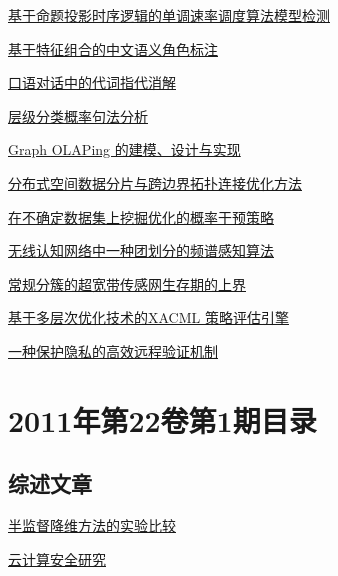 \documentclass[a4paper]{article}
\begin{document}
\href{http://www.jos.org.cn/ch/reader/download_pdf.aspx?file_no=3729&year_id=2011&quarter_id=2&falg=1}{基于命题投影时序逻辑的单调速率调度算法模型检测}

\href{http://www.jos.org.cn/ch/reader/download_pdf.aspx?file_no=3844&year_id=2011&quarter_id=2&falg=1}{基于特征组合的中文语义角色标注}

\href{http://www.jos.org.cn/ch/reader/download_pdf.aspx?file_no=3720&year_id=2011&quarter_id=2&falg=1}{口语对话中的代词指代消解}

\href{http://www.jos.org.cn/ch/reader/download_pdf.aspx?file_no=3809&year_id=2011&quarter_id=2&falg=1}{层级分类概率句法分析}

\href{http://www.jos.org.cn/ch/reader/download_pdf.aspx?file_no=3771&year_id=2011&quarter_id=2&falg=1}{Graph OLAPing 的建模、设计与实现}

\href{http://www.jos.org.cn/ch/reader/download_pdf.aspx?file_no=3798&year_id=2011&quarter_id=2&falg=1}{分布式空间数据分片与跨边界拓扑连接优化方法}

\href{http://www.jos.org.cn/ch/reader/download_pdf.aspx?file_no=3829&year_id=2011&quarter_id=2&falg=1}{在不确定数据集上挖掘优化的概率干预策略}

\href{http://www.jos.org.cn/ch/reader/download_pdf.aspx?file_no=3721&year_id=2011&quarter_id=2&falg=1}{无线认知网络中一种团划分的频谱感知算法}

\href{http://www.jos.org.cn/ch/reader/download_pdf.aspx?file_no=3748&year_id=2011&quarter_id=2&falg=1}{常规分簇的超宽带传感网生存期的上界}

\href{http://www.jos.org.cn/ch/reader/download_pdf.aspx?file_no=3707&year_id=2011&quarter_id=2&falg=1}{基于多层次优化技术的XACML 策略评估引擎}

\href{http://www.jos.org.cn/ch/reader/download_pdf.aspx?file_no=3714&year_id=2011&quarter_id=2&falg=1}{一种保护隐私的高效远程验证机制}


\section{\textbf{2011年第22卷第1期目录}}
\subsection{综述文章}
\href{http://www.jos.org.cn/ch/reader/download_pdf.aspx?file_no=3928&year_id=2011&quarter_id=1&falg=1}{半监督降维方法的实验比较}

\href{http://www.jos.org.cn/ch/reader/download_pdf.aspx?file_no=3958&year_id=2011&quarter_id=1&falg=1}{云计算安全研究}
\end{document}
